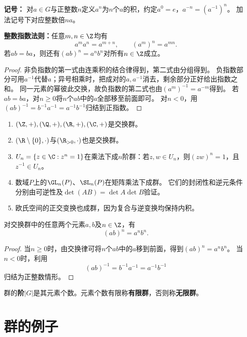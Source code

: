 \textbf{记号：}
对$a\in G$与正整数$n$定义$a^n$为$n$个$a$的积，约定$a^0=e$，$a^{-n}=(a^{-1})^n$。
加法记号下对应整数倍$na$。


\begin{proposition}
\textbf{整数指数法则：}任意$m,n\in\Z$均有
\[
a^ma^n=a^{m+n},\qquad(a^m)^n=a^{mn}.
\]
若$ab=ba$，则还有$(ab)^n=a^nb^n$对所有$n\in\Z$成立。
\end{proposition}
\begin{proof}
非负指数的第一式由连乘积的结合律得到，第二式由分组得到。
负指数部分可用$a^{-1}$代替$a$；异号相乘时，把成对的$a,a^{-1}$消去，剩余部分正好给出指数之和。
同一元素的幂彼此交换，故负指数的第二式也由$(a^m)^{-1}=a^{-m}$得到。
若$ab=ba$，对$n\geq0$将$n$个$ab$中的$a$全部移至前面即可。
对$n<0$，用$(ab)^{-1}=b^{-1}a^{-1}=a^{-1}b^{-1}$归结到正指数。
\end{proof}

\begin{example}
\begin{enumerate}
	\item $(\Z,+),(\Q,+),(\R,+),(\C,+)$是交换群。
	\item $(\R\setminus\{0\},\cdot)$与$(\R_{>0},\cdot)$也是交换群。
	\item $U_n=\{z\in\C:z^n=1\}$在乘法下成$n$阶群：若$z,w\in U_n$，则$(zw)^n=1$，且$z^{-1}\in U_n$。
	\item 数域$P$上的$\GL_n(P)$、$\SL_n(P)$在矩阵乘法下成群。
	它们的封闭性和逆元条件分别由可逆性及$\det(AB)=\det A\det B$验证。
	\item 欧氏空间的正交变换也成群，因为复合与逆变换均保持内积。
\end{enumerate}
\end{example}
\begin{proposition}
	对交换群中的任意两个元素$a,b$及$n\in\Z$，有
	\[
	(ab)^n=a^n b^n.
	\]
\end{proposition}
\begin{proof}
	当$n\geq0$时，由交换律可将$n$个$ab$中的$a$移到前面，得到$(ab)^n=a^nb^n$。
	当$n<0$时，利用
	\[
	(ab)^{-1}=b^{-1}a^{-1}=a^{-1}b^{-1}
	\]
	归结为正整数情形。
\end{proof}
\begin{definition}
群的\textbf{阶}$|G|$是其元素个数。元素个数有限称\textbf{有限群}，否则称\textbf{无限群}。

\end{definition}

\section{群的例子}
